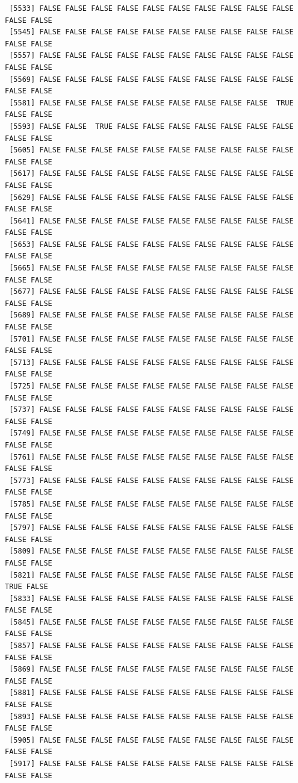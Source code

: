 \documentclass[
  a4paper,
  DIV=11,
  numbers=noendperiod]{scrartcl}
\begin{document}
\begin{verbatim}
 [5533] FALSE FALSE FALSE FALSE FALSE FALSE FALSE FALSE FALSE FALSE FALSE FALSE
 [5545] FALSE FALSE FALSE FALSE FALSE FALSE FALSE FALSE FALSE FALSE FALSE FALSE
 [5557] FALSE FALSE FALSE FALSE FALSE FALSE FALSE FALSE FALSE FALSE FALSE FALSE
 [5569] FALSE FALSE FALSE FALSE FALSE FALSE FALSE FALSE FALSE FALSE FALSE FALSE
 [5581] FALSE FALSE FALSE FALSE FALSE FALSE FALSE FALSE FALSE  TRUE FALSE FALSE
 [5593] FALSE FALSE  TRUE FALSE FALSE FALSE FALSE FALSE FALSE FALSE FALSE FALSE
 [5605] FALSE FALSE FALSE FALSE FALSE FALSE FALSE FALSE FALSE FALSE FALSE FALSE
 [5617] FALSE FALSE FALSE FALSE FALSE FALSE FALSE FALSE FALSE FALSE FALSE FALSE
 [5629] FALSE FALSE FALSE FALSE FALSE FALSE FALSE FALSE FALSE FALSE FALSE FALSE
 [5641] FALSE FALSE FALSE FALSE FALSE FALSE FALSE FALSE FALSE FALSE FALSE FALSE
 [5653] FALSE FALSE FALSE FALSE FALSE FALSE FALSE FALSE FALSE FALSE FALSE FALSE
 [5665] FALSE FALSE FALSE FALSE FALSE FALSE FALSE FALSE FALSE FALSE FALSE FALSE
 [5677] FALSE FALSE FALSE FALSE FALSE FALSE FALSE FALSE FALSE FALSE FALSE FALSE
 [5689] FALSE FALSE FALSE FALSE FALSE FALSE FALSE FALSE FALSE FALSE FALSE FALSE
 [5701] FALSE FALSE FALSE FALSE FALSE FALSE FALSE FALSE FALSE FALSE FALSE FALSE
 [5713] FALSE FALSE FALSE FALSE FALSE FALSE FALSE FALSE FALSE FALSE FALSE FALSE
 [5725] FALSE FALSE FALSE FALSE FALSE FALSE FALSE FALSE FALSE FALSE FALSE FALSE
 [5737] FALSE FALSE FALSE FALSE FALSE FALSE FALSE FALSE FALSE FALSE FALSE FALSE
 [5749] FALSE FALSE FALSE FALSE FALSE FALSE FALSE FALSE FALSE FALSE FALSE FALSE
 [5761] FALSE FALSE FALSE FALSE FALSE FALSE FALSE FALSE FALSE FALSE FALSE FALSE
 [5773] FALSE FALSE FALSE FALSE FALSE FALSE FALSE FALSE FALSE FALSE FALSE FALSE
 [5785] FALSE FALSE FALSE FALSE FALSE FALSE FALSE FALSE FALSE FALSE FALSE FALSE
 [5797] FALSE FALSE FALSE FALSE FALSE FALSE FALSE FALSE FALSE FALSE FALSE FALSE
 [5809] FALSE FALSE FALSE FALSE FALSE FALSE FALSE FALSE FALSE FALSE FALSE FALSE
 [5821] FALSE FALSE FALSE FALSE FALSE FALSE FALSE FALSE FALSE FALSE  TRUE FALSE
 [5833] FALSE FALSE FALSE FALSE FALSE FALSE FALSE FALSE FALSE FALSE FALSE FALSE
 [5845] FALSE FALSE FALSE FALSE FALSE FALSE FALSE FALSE FALSE FALSE FALSE FALSE
 [5857] FALSE FALSE FALSE FALSE FALSE FALSE FALSE FALSE FALSE FALSE FALSE FALSE
 [5869] FALSE FALSE FALSE FALSE FALSE FALSE FALSE FALSE FALSE FALSE FALSE FALSE
 [5881] FALSE FALSE FALSE FALSE FALSE FALSE FALSE FALSE FALSE FALSE FALSE FALSE
 [5893] FALSE FALSE FALSE FALSE FALSE FALSE FALSE FALSE FALSE FALSE FALSE FALSE
 [5905] FALSE FALSE FALSE FALSE FALSE FALSE FALSE FALSE FALSE FALSE FALSE FALSE
 [5917] FALSE FALSE FALSE FALSE FALSE FALSE FALSE FALSE FALSE FALSE FALSE FALSE

\end{verbatim}
\end{document}
